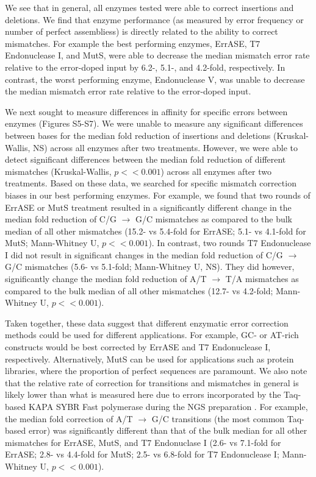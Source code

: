 \documentclass[twocolumn]{article}
\begin{document}
We see that in general, all enzymes tested were able to correct insertions and deletions. We find that enzyme performance (as measured by error frequency or number of perfect assembliess) is directly related to the ability to correct mismatches. For example the best performing enzymes, ErrASE, T7 Endonuclease I, and MutS, were able to decrease the median mismatch error rate relative to the error-doped input by 6.2-, 5.1-, and 4.2-fold, respectively. In contrast, the worst performing enzyme, Endonuclease V, was unable to decrease the median mismatch error rate relative to the error-doped input.

We next sought to measure differences in affinity for specific errors between enzymes (Figures S5-S7). We were unable to measure any significant differences between bases for the median fold reduction of insertions and deletions (Kruskal-Wallis, NS) across all enzymes after two treatments. However, we were able to detect significant differences between the median fold reduction of different mismatches (Kruskal-Wallis, $p << 0.001$) across all enzymes after two treatments. Based on these data, we searched for specific mismatch correction biases in our best performing enzymes. For example, we found that two rounds of ErrASE or MutS treatment resulted in a significantly different change in the median fold reduction of C/G $\to$ G/C mismatches as compared to the bulk median of all other mismatches (15.2- vs 5.4-fold for ErrASE; 5.1- vs 4.1-fold for MutS; Mann-Whitney U, $p << 0.001$). In contrast, two rounds T7 Endonuclease I did not result in significant changes in the median fold reduction of C/G $\to$ G/C mismatches (5.6- vs 5.1-fold; Mann-Whitney U, NS). They did however, significantly change the median fold reduction of A/T $\to$ T/A mismatches as compared to the bulk median of all other mismatches (12.7- vs 4.2-fold; Mann-Whitney U, $p << 0.001$).

Taken together, these data suggest that different enzymatic error correction methods could be used for different applications. For example, GC- or AT-rich constructs would be best corrected by ErrASE and T7 Endonuclease I, respectively. Alternatively, MutS can be used for applications such as protein libraries, where the proportion of perfect sequences are paramount. We also note that the relative rate of correction for transitions and mismatches in general is likely lower than what is measured here due to errors incorporated by the Taq-based KAPA SYBR Fast polymerase during the NGS preparation \cite{keohavong1989,hestand2016,mcinerney2014,potapov2017,saiki1988,lee2016}. For example, the median fold correction of A/T $\to$ G/C transitions (the most common Taq-based error) was significantly different than that of the bulk median for all other mismatches for ErrASE, MutS, and T7 Endonuclase I (2.6- vs 7.1-fold for ErrASE; 2.8- vs 4.4-fold for MutS; 2.5- vs 6.8-fold for T7 Endonuclease I; Mann-Whitney U, $p << 0.001$).
\end{document}

